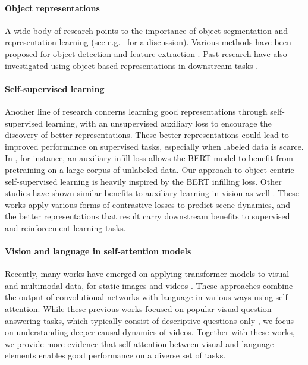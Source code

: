 \documentclass{article}
\begin{document}
 \paragraph{Object representations}
A wide body of research points to the importance of object segmentation and representation learning (see e.g.~\citet{garnelo2019reconciling} for a discussion).
Various methods have been proposed for object detection and feature extraction
\citep{ren2015faster, he2017maskrcnn, monet, greff2019-iodine, Lin2020SPACE, du2020unsupervised, slot_attention}.
Past research have also investigated using object based representations in downstream tasks
\citep{raposo2017discovering, desta2018object}.



\paragraph{Self-supervised learning}
 Another line of research concerns learning good representations through self-supervised learning,
 with an unsupervised auxiliary loss to encourage the discovery of better representations.
 These better representations could lead to improved performance on supervised tasks,
 especially when labeled data is scarce.
 In \citet{devlin2018bert}, for instance, an auxiliary infill loss allows the BERT model to benefit from  pretraining on
 a large corpus of unlabeled data.
 Our approach to object-centric self-supervised learning is heavily inspired by the BERT infilling loss.
 Other studies have shown similar benefits to auxiliary learning in vision as well \citep{gregor2019Shaping, Han19dpc, chen2020simple}. These works apply various forms of contrastive losses to predict scene dynamics,
 and
 the better representations that result carry
 downstream benefits to supervised and reinforcement learning tasks.
 
 \paragraph{Vision and language in self-attention models}
 


Recently, many works have emerged on applying transformer models to visual and multimodal data,
for static images \citep{li2019visualbert, lu2019vilbert, tan2019lxmert, Su2020VL-BERT} and videos \citep{zambaldi2018deep, sun-videobert, sun2019contrastive}.
These approaches combine the output of convolutional networks with language in various ways using self-attention.
While these previous works focused on popular visual question answering tasks,
which typically consist of descriptive questions only \citep{clevrer},
we focus on understanding deeper causal dynamics of videos.
Together with these works, we provide more evidence that self-attention
between visual and language elements enables good performance on a diverse set of tasks.
\end{document}
